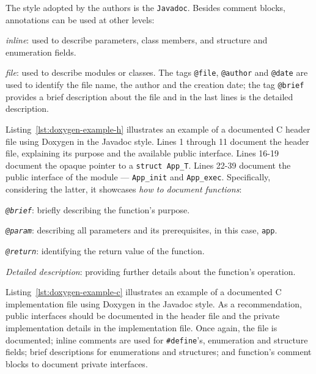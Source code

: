 The style adopted by the authors is the \texttt{Javadoc}. Besides comment
blocks, annotations can be used at other levels:
\begin{item-c}
\item \emph{inline}: used to describe parameters, class members, and structure
  and enumeration fields.

\vspace{-.8em}  
\item \emph{file}: used to describe modules or classes. The tags \texttt{@file},
  \texttt{@author} and \texttt{@date} are used to identify the file name, the
  author and the creation date; the tag \texttt{@brief} provides a brief
  description about the file and in the last lines is the detailed description.

\end{item-c}

Listing~\ref{lst:doxygen-example-h} illustrates an example of a documented C
header file using Doxygen in the Javadoc style. Lines 1 through 11 document the
header file, explaining its purpose and the available public interface. Lines
16-19 document the opaque pointer to a \texttt{struct App\_T}. Lines 22-39
document the public interface of the module --- \texttt{App\_init} and
\texttt{App\_exec}. Specifically, considering the latter, it showcases \emph{how
  to document functions}:
\begin{item-c}
\item \emph{\texttt{@brief}}: briefly describing the function's purpose.
\item \emph{\texttt{@param}}: describing all parameters and its prerequisites,
  in this case, \texttt{app}.
\item \emph{\texttt{@return}}: identifying the return value of the function.
\item \emph{Detailed description}: providing further details about the
  function's operation.
\end{item-c}
%



Listing~\ref{lst:doxygen-example-c} illustrates an example of a documented C
implementation file using Doxygen in the Javadoc style. As a recommendation,
public interfaces should be documented in the header file and the private
implementation details in the implementation file. Once again, the file is
documented; inline comments are used for \texttt{\#define}'s, enumeration and
structure fields; brief descriptions for enumerations and structures; and
function's comment blocks to document private interfaces. 
%

%

